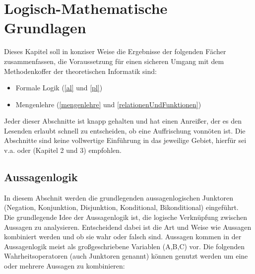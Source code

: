 \section{Logisch-Mathematische Grundlagen}\label{sec:grundlagen}
Dieses Kapitel soll in konziser Weise die Ergebnisse der folgenden Fächer zusammenfassen,
die Voraussetzung für einen sicheren Umgang mit dem Methodenkoffer
der theoretischen Informatik sind:
\begin{itemize}
    \item Formale Logik (\autoref{al} und \autoref{pl})
    \item Mengenlehre (\autoref{mengenlehre} und \autoref{relationenUndFunktionen})
\end{itemize}
Jeder dieser Abschnitte ist knapp gehalten und hat einen Anreißer,
der es den Lesenden erlaubt schnell zu entscheiden,
ob eine Auffrischung vonnöten ist.
Die Abschnitte sind keine vollwertige Einführung in das jeweilige Gebiet,
hierfür sei v.a. \cite{link} oder \cite{hoffmann} (Kapitel 2 und 3) empfohlen.

\subsection{Aussagenlogik}\label{al}
In diesem Abschnit werden die grundlegenden aussagenlogischen Junktoren
(Negation, Konjunktion, Disjunktion, Konditional, Bikonditional) eingeführt.\\


Die grundlegende Idee der Aussagenlogik ist,
die logische Verknüpfung zwischen Aussagen zu analysieren.
Entscheidend dabei ist die Art und Weise wie Aussagen kombiniert werden
und ob sie wahr oder falsch sind.
Aussagen kommen in der Aussagenlogik meist als großgeschriebene Variablen (A,B,C) vor.
Die folgenden Wahrheitsoperatoren (auch Junktoren genannt)
können genutzt werden um eine oder mehrere Aussagen zu kombinieren:

